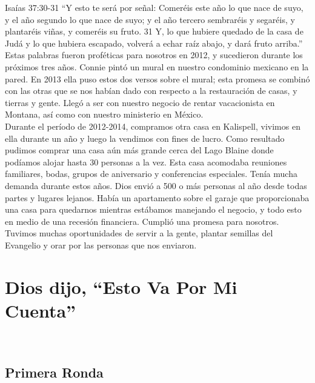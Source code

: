 \documentclass[twoside, 12pt]{book}
\begin{document}
Isaías 37:30-31 “Y esto te será por señal: Comeréis este año lo que nace de suyo, y el año segundo lo que nace de suyo; y el año tercero sembraréis y segaréis, y plantaréis viñas, y comeréis su fruto. 31 Y, lo que hubiere quedado de la casa de Judá y lo que hubiera escapado, volverá a echar raíz abajo, y dará fruto arriba.”\\

Estas palabras fueron proféticas para nosotros en 2012, y sucedieron durante los próximos tres años.  Connie pintó un mural en nuestro condominio mexicano en la pared. En 2013 ella puso estos dos versos sobre el mural; esta promesa se combinó con las otras que se nos habían dado con respecto a la restauración de casas, y tierras y gente. Llegó a ser con nuestro negocio de rentar vacacionista en Montana, así como con nuestro ministerio en México.\\

Durante el período de 2012-2014, compramos otra casa en Kalispell, vivimos en ella durante un año y luego la vendimos con fines de lucro. Como resultado pudimos comprar una casa aún más grande cerca del Lago Blaine donde podíamos alojar hasta 30 personas a la vez. Esta casa acomodaba reuniones familiares, bodas, grupos de aniversario y conferencias especiales. Tenía mucha demanda durante estos años. Dios envió a 500 o más personas al año desde todas partes y lugares lejanos. Había un apartamento sobre el garaje que proporcionaba una casa para quedarnos mientras estábamos manejando el negocio, y todo esto en medio de una recesión financiera. Cumplió una promesa para nosotros. Tuvimos muchas oportunidades de servir a la gente, plantar semillas del Evangelio y orar por las personas que nos enviaron.\\ 



\chapter{Dios dijo, “Esto Va Por Mi Cuenta”}
\

\section{Primera Ronda}
\
\end{document}
